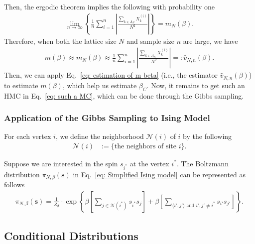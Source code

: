 \documentclass[11pt,letterpaper, leqno]{article}
\numberwithin{equation}{section}
\numberwithin{theorem}{section}
\numberwithin{lemma}{section}
\numberwithin{corollary}{section}
\numberwithin{definition}{section}
\numberwithin{proposition}{section}
\numberwithin{remark}{section}
\numberwithin{example}{section}
\begin{document}
Then, the ergodic theorem implies the following with probability one
\begin{align*}
    \lim_{n\rightarrow\infty} \left\{ \frac{1}{n}\sum_{i=1}^n \left\vert\frac{\sum_{k\in\Lambda_N} X^{(i)}_k}{N^2}\right\vert \right\} = m_N(\beta).
\end{align*}
Therefore, when both the lattice size $N$ and sample size $n$ are large, we have
\begin{align}\label{eq: estimation of m beta}
    m(\beta)\approx m_N(\beta) \approx \frac{1}{n}\sum_{i=1}^n \left\vert\frac{\sum_{k\in\Lambda_N} X^{(i)}_k}{N^2}\right\vert =: \widehat{v}_{N,n}(\beta).
\end{align}
Then, we can apply Eq.~\eqref{eq: estimation of m beta} (i.e., the estimator $\widehat{v}_{N,n}(\beta)$) to estimate $m(\beta)$, which help us estimate $\beta_C$. Now, it remains to get such an HMC in Eq.~\eqref{eq: such a MC}, which can be done through the Gibbs sampling.

\subsubsection{Application of the Gibbs Sampling to Ising Model}

For each vertex $i$, we define the neighborhood $\mathcal{N}(i)$ of $i$ by the following
\begin{align*}
    \mathcal{N}(i)&:=\{\mbox{the neighbors of site }i\}.
\end{align*}

Suppose we are interested in the spin $s_{i^*}$ at the vertex $i^*$. The Boltzmann distribution $\pi_{N,\beta}(\boldsymbol{s})$ in Eq.~\eqref{eq: Simplified Ising model} can be represented as follows
\begin{align}\label{eq: Boltzmann distribution of Ising model for the graphical purpose}
    \pi_{N,\beta}(\boldsymbol{s}) = \frac{1}{Z_\beta}\cdot\exp\left\{\beta\left[\sum_{j\in\mathcal{N}(i^*)}s_{i^*}s_j\right]+\beta\left[\sum_{\langle i',j'\rangle\mbox{ and }i',j'\ne i^*}s_{i'}s_{j'}\right]\right\}.
\end{align}

\subsection{Conditional Distributions}
\end{document}
